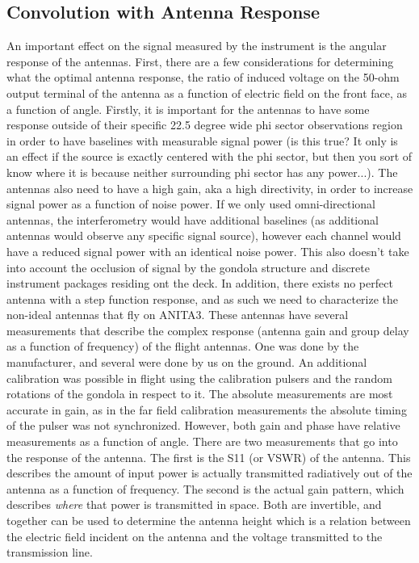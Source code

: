 	\subsection{Convolution with Antenna Response}
		An important effect on the signal measured by the instrument is the angular response of the antennas.  First, there are a few considerations for determining what the optimal antenna response, the ratio of induced voltage on the 50-ohm output terminal of the antenna as a function of electric field on the front face, as a function of angle.  Firstly, it is important for the antennas to have some response outside of their specific 22.5 degree wide phi sector observations region in order to have baselines with measurable signal power (is this true?  It only is an effect if the source is exactly centered with the phi sector, but then you sort of know where it is because neither surrounding phi sector has any power...).  The antennas also need to have a high gain, aka a high directivity, in order to increase signal power as a function of noise power.  If we only used omni-directional antennas, the interferometry would have additional baselines (as additional antennas would observe any specific signal source), however each channel would have a reduced signal power with an identical noise power.  This also doesn't take into account the occlusion of signal by the gondola structure and discrete instrument packages residing ont the deck.  In addition, there exists no perfect antenna with a step function response, and as such we need to characterize the non-ideal antennas that fly on ANITA3.
		These antennas have several measurements that describe the complex response (antenna gain and group delay as a function of frequency) of the flight antennas.  One was done by the manufacturer, and several were done by us on the ground.  An additional calibration was possible in flight using the calibration pulsers and the random rotations of the gondola in respect to it.  The absolute measurements are most accurate in gain, as in the far field calibration measurements the absolute timing of the pulser was not synchronized.  However, both gain and phase have relative measurements as a function of angle.
		There are two measurements that go into the response of the antenna.  The first is the S11 (or VSWR) of the antenna.  This describes the amount of input power is actually transmitted radiatively out of the antenna as a function of frequency.  The second is the actual gain pattern, which describes \textit{where} that power is transmitted in space.  Both are invertible, and together can be used to determine the antenna height which is a relation between the electric field incident on the antenna and the voltage transmitted to the transmission line.

